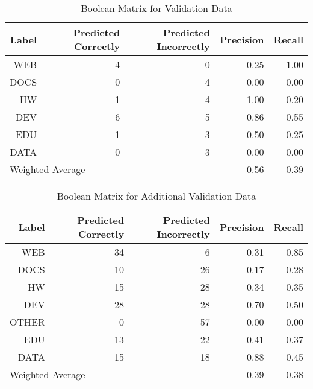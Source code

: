 \begin{table}[h]
\centering
\caption{Boolean Matrix for Validation Data }
\label{boolean_matrix}
\begin{tabular}{|r|r|r|r|r|}
 \hline
Label & Predicted Correctly & Predicted Incorrectly & Precision & Recall \\ \hline
WEB & 4 & 0 & 0.25 & 1.00 \\ \hline
DOCS & 0 & 4 & 0.00 & 0.00 \\ \hline
HW & 1 & 4 & 1.00 & 0.20 \\ \hline
DEV & 6 & 5 & 0.86 & 0.55 \\ \hline
EDU & 1 & 3 & 0.50 & 0.25 \\ \hline
DATA & 0 & 3 & 0.00 & 0.00 \\ \hline
\multicolumn{3}{|l|}{Weighted Average} & 0.56 & 0.39 \\ \hline
\end{tabular}
\end{table}

\begin{table}[h]
\centering
\caption{Boolean Matrix for Additional Validation Data}
\label{boolean_matrix}
\begin{tabular}{|r|r|r|r|r|}
 \hline
Label & Predicted Correctly & Predicted Incorrectly & Precision & Recall \\ \hline
WEB & 34 & 6 & 0.31 & 0.85 \\ \hline
DOCS & 10 & 26 & 0.17 & 0.28 \\ \hline
HW & 15 & 28 & 0.34 & 0.35 \\ \hline
DEV & 28 & 28 & 0.70 & 0.50 \\ \hline
OTHER & 0 & 57 & 0.00 & 0.00 \\ \hline
EDU & 13 & 22 & 0.41 & 0.37 \\ \hline
DATA & 15 & 18 & 0.88 & 0.45 \\ \hline
\multicolumn{3}{|l|}{Weighted Average} & 0.39 & 0.38 \\ \hline
\end{tabular}
\end{table}